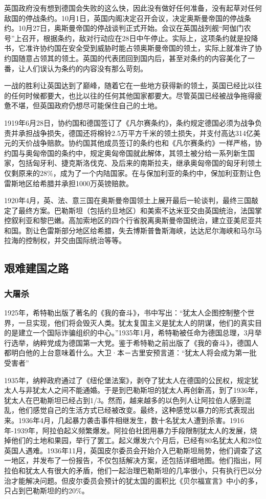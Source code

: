 \documentclass{article}
\begin{document}
英国政府没有想到德国会失败的这么快，因此没有做好任何准备，没有起草对任何敌国的停战条约。10月1日，英国内阁决定召开会议，决定奥斯曼帝国的停战条约。10月27日，奥斯曼帝国的停战谈判正式开始。会议在英国战列舰“阿伽门农号”上召开，根据条约，敌对行动应在28日中午停止。实际上，这项条约就是投降书，它准许协约国在安全受到威胁时能占领奥斯曼帝国的领土，实际上就准许了协约国随意占领其的领土。英国的代表团回到国内后，甚至对条约的内容美化了一番，让人们误认为条约的内容没有那么苛刻。

一战的胜利让英国达到了巅峰，随着它在一些地方获得新的领土，英国已经比以往的任何时候都要大，也比以往的任何其他国家都要大。尽管英国已经被战争拖得疲惫不堪，但英国政府仍想尽可能保住自己的土地。

1919年6月28日，协约国和德国签订了《凡尔赛条约》，条约规定德国必须为战争负责并承担战争损失，德国还将棉铃2.5万平方千米的领土损失，并支付高达314亿美元的天价战争赔款。协约国其他成员签订的条约也和《凡尔赛条约》一样严格，协约国与奥匈帝国的条约中，规定奥匈帝国就此解体，其领土被分给一系列新生国家，包括匈牙利、捷克斯洛伐克、及后来的南斯拉夫，继承奥匈帝国的匈牙利领土仅剩原来的28\%，成为了一个内陆国家。在与保加利亚的条约中，保加利亚割让色雷斯地区给希腊并承担1000万英镑赔款。

1920年4月，英、法、意三国在奥斯曼帝国领土上展开最后一轮谈判，最终三国敲定了最终方案。巴勒斯坦（包括约旦地区）和美索不达米亚交由英国统治，法国掌控叙利亚和黎巴嫩。高加索地区的四个行省脱离奥斯曼帝国统治，建立亚美尼亚共和国。割让色雷斯部分地区给希腊，失去博斯普鲁斯海峡，达达尼尔海峡和马尔马拉海的控制权，并交由国际统治等等。\clearpage
\subsection{艰难建国之路}
\subsubsection{大屠杀}
1925年，希特勒出版了著名的《我的奋斗》，书中写出：“犹太人企图控制整个世界，一旦实现，他们将会毁灭人类。犹太复国主义是犹太人的阴谋，他们的真实目的是建立一个国际诈骗组织的中心。”1935年1月，希特勒被任命为德国总理，3月举行选举，纳粹党成为德国第一大党。鉴于希特勒之前出版了《我的奋斗》，德国人都明白他的上台意味着什么。大卫·本－古里安预言道：“犹太人将会成为第一批受害者”

1935年，纳粹政府通过了《纽伦堡法案》，剥夺了犹太人在德国的公民权，规定犹太人与非犹太人之间不能通婚。于是到巴勒斯坦的犹太人再创新高，到了1936年，犹太人在巴勒斯坦已经占到1/3。然而，越来越多的以色列人让阿拉伯人感到混乱，他们感觉自己的生活方式已经被改变。最终，这种感觉以暴力的形式表现出来。1936年4月，几起暴力袭击事件相继发生，数十名犹太人遭到杀害。1916年-1939年，阿拉伯起义频繁爆发。阿拉伯社团用暴力手段限制犹太人的发展，烧掉他们的土地和果园，举行了罢工。起义爆发六个月后，已经有80名犹太人和28位英国人遇难。1936年11月，英国皮尔委员会开始介入巴勒斯坦局势，他们调查了这一地区，并发布了一份报告，不仅包括解决方案，还包括详细地图。他们指出，阿拉伯和犹太人有很大的矛盾，他们一起治理巴勒斯坦的几率很小，只有执行巴以分治才能解决问题。但皮尔委员会预计的犹太国的面积比《贝尔福宣言》中小的多，只占到巴勒斯坦的约20\%。
\end{document}
